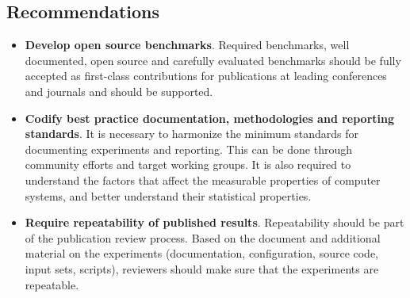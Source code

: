 \subsection{Recommendations}
\begin{itemize}
    \item \textbf{Develop open source benchmarks}. Required benchmarks, well documented, open source and carefully evaluated benchmarks should be fully accepted as first-class contributions for publications at leading conferences and journals and should be supported.
    \item \textbf{Codify best practice documentation, methodologies and reporting standards}. It is necessary to harmonize the minimum standards for documenting experiments and reporting. This can be done through community efforts and target working groups. It is also required to understand the factors that affect the measurable properties of computer systems, and better understand their statistical properties.
    \item \textbf{Require repeatability of published results}. Repeatability should be part of the publication review process. Based on the document and additional material on the experiments (documentation, configuration, source code, input sets, scripts), reviewers should make sure that the experiments are repeatable.
\end{itemize}
